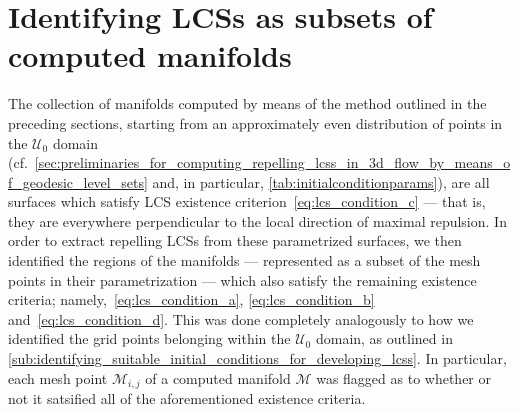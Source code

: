 \section{Identifying LCSs as subsets of computed manifolds}
\label{sec:identifying_lcss_as_subsets_of_computed_manifolds}

The collection of manifolds computed by means of the method
outlined in the preceding sections, starting from an approximately
even distribution of points in the $\mathcal{U}_{0}$ domain
(cf.\
\cref{sec:preliminaries_for_computing_repelling_lcss_in_3d_flow_by_means_of_geodesic_level_sets}
and, in particular, \cref{tab:initialconditionparams}), are all surfaces which
satisfy LCS existence criterion~\eqref{eq:lcs_condition_c} --- that is,
they are everywhere perpendicular to the local direction of maximal repulsion.
In order to extract repelling LCSs from these parametrized surfaces,
we then identified the regions of the manifolds --- represented as a subset
of the mesh points in their parametrization --- which also satisfy the
remaining existence criteria; namely,~\eqref{eq:lcs_condition_a},
\eqref{eq:lcs_condition_b} and~\eqref{eq:lcs_condition_d}. This was done
completely analogously to how we identified the grid points belonging within the
$\mathcal{U}_{0}$ domain, as outlined in
\cref{sub:identifying_suitable_initial_conditions_for_developing_lcss}.
In particular, each mesh point $\mathcal{M}_{i,j}$ of a computed manifold
$\mathcal{M}$ was flagged as to whether or not it satsified all
of the aforementioned existence criteria.

